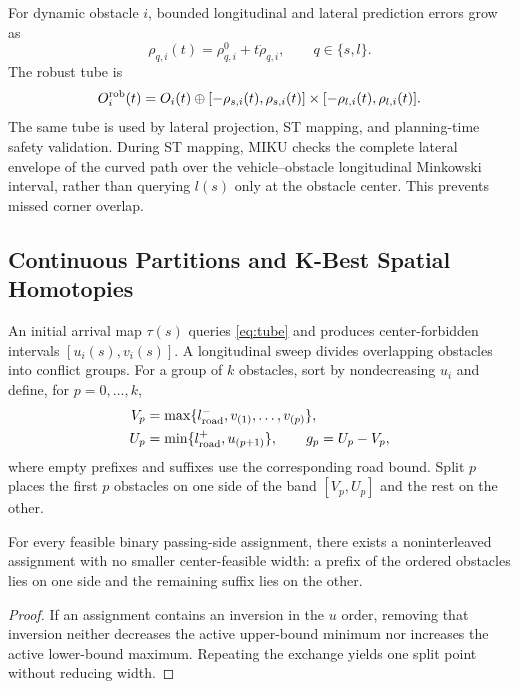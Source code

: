 For dynamic obstacle $i$, bounded longitudinal and lateral prediction errors grow as
\begin{equation}
 \rho_{q,i}(t)=\rho^0_{q,i}+t\dot\rho_{q,i},\qquad q\in\{s,l\}.
\end{equation}
The robust tube is
\begin{equation}
 O_i^{\rm rob}(t)=O_i(t)\oplus[-\rho_{s,i}(t),\rho_{s,i}(t)]
 \times[-\rho_{l,i}(t),\rho_{l,i}(t)].
 \label{eq:tube}
\end{equation}
The same tube is used by lateral projection, ST mapping, and planning-time safety validation. During ST mapping, MIKU checks the complete lateral envelope of the curved path over the vehicle--obstacle longitudinal Minkowski interval, rather than querying $l(s)$ only at the obstacle center. This prevents missed corner overlap.

\subsection{Continuous Partitions and K-Best Spatial Homotopies}

An initial arrival map $\tau(s)$ queries \eqref{eq:tube} and produces center-forbidden intervals $[u_i(s),v_i(s)]$. A longitudinal sweep divides overlapping obstacles into conflict groups. For a group of $k$ obstacles, sort by nondecreasing $u_i$ and define, for $p=0,\ldots,k$,
\begin{align}
 V_p&=\max\{l^-_{\rm road},v_{(1)},\ldots,v_{(p)}\},\\
 U_p&=\min\{l^+_{\rm road},u_{(p+1)}\},\qquad g_p=U_p-V_p,
 \label{eq:gap}
\end{align}
where empty prefixes and suffixes use the corresponding road bound. Split $p$ places the first $p$ obstacles on one side of the band $[V_p,U_p]$ and the rest on the other.

\begin{lemma}
For every feasible binary passing-side assignment, there exists a noninterleaved assignment with no smaller center-feasible width: a prefix of the ordered obstacles lies on one side and the remaining suffix lies on the other.
\label{lem:partition}
\end{lemma}
\begin{proof}
If an assignment contains an inversion in the $u$ order, removing that inversion neither decreases the active upper-bound minimum nor increases the active lower-bound maximum. Repeating the exchange yields one split point without reducing width.
\end{proof}

